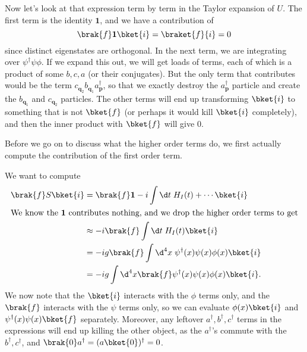 \documentclass[a4paper]{article}
\begin{document}
Now let's look at that expression term by term in the Taylor expansion of $U$. The first term is the identity $\mathbf{1}$, and we have a contribution of
\[
  \brak{f}\mathbf{1}\bket{i} = \braket{f}{i} = 0
\]
since distinct eigenstates are orthogonal. In the next term, we are integrating over $\psi^\dagger \psi \phi$. If we expand this out, we will get loads of terms, each of which is a product of some $b, c, a$ (or their conjugates). But the only term that contributes would be the term $c_{\mathbf{q}_2}b_{\mathbf{q}_1}a_{\mathbf{p}}^\dagger$, so that we exactly destroy the $a_\mathbf{p}^\dagger$ particle and create the $b_{\mathbf{q}_1}$ and $c_{\mathbf{q}_2}$ particles. The other terms will end up transforming $\bket{i}$ to something that is not $\bket{f}$ (or perhaps it would kill $\bket{i}$ completely), and then the inner product with $\bket{f}$ will give $0$.

Before we go on to discuss what the higher order terms do, we first actually compute the contribution of the first order term.

We want to compute
\begin{align*}
  \brak{f}S\bket{i} &= \brak{f}\mathbf{1} - i\int \d t\; H_I(t) + \cdots\bket{i}\\
  \intertext{We know the $\mathbf{1}$ contributes nothing, and we drop the higher order terms to get}
  &\approx -i \brak{f} \int \d t\; H_I(t) \bket{i}\\
  &= -ig \brak{f}\int \d^4 x\; \psi^\dagger(x) \psi(x) \phi(x) \bket{i}\\
  &= -ig \int \d^4 x \brak{f}\psi^\dagger(x) \psi(x) \phi(x) \bket{i}.
\end{align*}
We now note that the $\bket{i}$ interacts with the $\phi$ terms only, and the $\brak{f}$ interacts with the $\psi$ terms only, so we can evaluate $\phi(x)\bket{i}$ and $\psi^\dagger (x)\psi(x) \bket{f}$ separately. Moreover, any leftover $a^\dagger, b^\dagger, c^\dagger$ terms in the expressions will end up killing the other object, as the $a^\dagger$'s commute with the $b^\dagger, c^\dagger$, and $\brak{0}a^\dagger = (a \bket{0})^\dagger = 0$.
\end{document}
